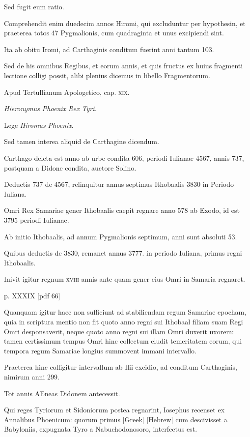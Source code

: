 \begin{parnumbers}
Sed fugit eum ratio.

Comprehendit
enim duedecim annos Hiromi, qui excluduntur per hypothesin,
et praeterea totos 47 Pygmalionis, cum quadraginta et
unus excipiendi sint.

Ita ab obitu Iromi, ad Carthaginis conditum
fuerint anni tantum 103.

Sed de his omnibus Regibus, et
eorum annis, et quis fructus ex huius fragmenti lectione colligi
possit, alibi plenius dicemus in libello Fragmentorum.

Apud Tertullianum Apologetico, cap. \textsc{xix}.

\textit{Hieronymus Phoenix Rex Tyri.}

Lege \textit{Hiromus Phoenix}.

Sed tamen interea aliquid de Carthagine
dicendum.

Carthago deleta est anno ab urbe condita 606,
periodi Iulianae 4567, annis 737, postquam a Didone condita,
auctore Solino.

Deductis 737 de 4567, relinquitur annus
septimus Ithobaalis 3830 in Periodo Iuliana.

Omri Rex Samariae
gener Ithobaalis caepit regnare anno 578 ab Exodo, id
est 3795 periodi Iulianae.

Ab initio Ithobaalis, ad annum Pygmalionis
septimum, anni sunt absoluti 53.

Quibus deductis de
3830, remanet annus 3777. in periodo Iuliana, primus regni
Ithobaalis.

Inivit igitur regnum \textsc{xviii} annis ante quam gener eius
Omri in Samaria regnaret.

\clearpage
p. XXXIX [pdf 66]

Quanquam igitur haec non sufficiunt
ad stabiliendam regum Samariae epocham, quia in scriptura mentio
non fit quoto anno regni sui Ithobaal filiam suam Regi Omri desponsaverit,
neque quoto anno regni sui illam Omri duxerit uxorem:
tamen certissimum tempus Omri hinc collectum eludit temeritatem
eorum, qui tempora regum Samariae longius summovent
immani intervallo.

Praeterea hinc colligitur intervallum
ab Ilii excidio, ad conditum Carthaginis, nimirum anni 299.

Tot annis AEneas Didonem antecessit.

Qui reges Tyriorum et Sidoniorum
postea regnarint, Iosephus recenset ex Annalibus Phoenicum:
quorum primus \textgreek{[Greek]} \texthebrew{[Hebrew]}
 cum descivisset a Babyloniis,
expugnata Tyro a Nabuchodonosoro, interfectus est.


\end{parnumbers}
